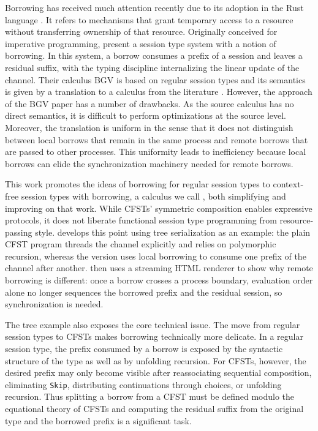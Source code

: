 Borrowing has received much attention recently due to its adoption in
the Rust language \cite{rust-reference}. It refers to mechanisms that
grant temporary access to a resource without transferring ownership of
that resource. Originally conceived for imperative programming,
\citet{DBLP:journals/pacmpl/SaffrichS0V25} present a session type
system with a notion of borrowing.
In this system, a borrow consumes a prefix of a session and leaves a residual suffix, with the
typing discipline internalizing the linear update of the channel.
Their calculus BGV is based on regular
session types \cite{DBLP:conf/esop/LindleyM15} and its semantics is
given by a translation to a calculus from the literature
\cite{DBLP:journals/lmcs/KokkeD23}. However, the approach of the BGV paper has a number of
drawbacks. As the source calculus has no direct semantics, it is
difficult to perform optimizations at the source level. Moreover, the
translation is uniform in the sense that it does not distinguish
between local borrows that remain in the same process and remote
borrows that are passed to other processes. This uniformity leads to
inefficiency because local borrows can elide the synchronization
machinery needed for remote borrows. 

This work promotes the ideas of borrowing for regular session types
\cite{DBLP:journals/pacmpl/SaffrichS0V25} to context-free session
types with borrowing, a calculus we call \thecalculus, both
simplifying and improving on that work. While CFSTs'
symmetric composition enables expressive protocols, it does not
liberate functional session type programming from resource-passing
style.  develops this point using tree
serialization as an example: the plain CFST program
threads the channel explicitly and relies on polymorphic recursion,
whereas the \thecalculus version uses local borrowing to consume one
prefix of the channel after another.  then
uses a streaming HTML renderer to show why remote borrowing is
different: once a borrow crosses a process boundary, evaluation order
alone no longer sequences the borrowed prefix and the residual
session, so synchronization is needed.

The tree example also exposes the core technical issue. The move from regular 
session types to CFSTs makes borrowing technically more delicate. In a
regular session type, the prefix consumed by a borrow is exposed by
the syntactic structure of the type as well as by unfolding
recursion. For CFSTs, however, the desired 
prefix may only become visible after reassociating sequential
composition, eliminating \lstinline{Skip}, distributing continuations
through choices, or unfolding recursion.  Thus splitting a borrow from
a CFST must be defined modulo the equational theory of CFSTs and
computing the residual suffix from the original type and the borrowed
prefix is a significant task.

